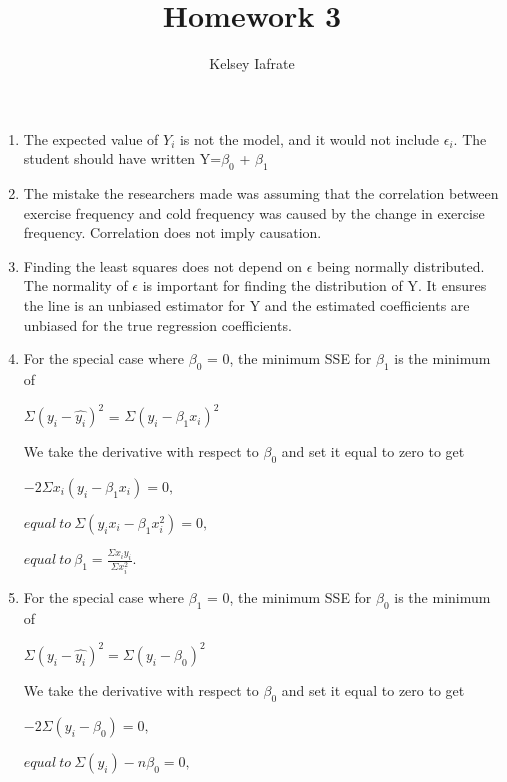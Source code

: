 \documentclass[]{article}
\author{Kelsey Iafrate}
\title{Homework 3}
\begin{document}
\maketitle




\begin{enumerate}

\item 
The expected value of $Y_i$ is not the model, and it would not include $\epsilon _i$. The student should have written Y=$\beta _0$ + $\beta _1$

\item
The mistake the researchers made was assuming that the correlation between exercise frequency and cold frequency was caused by the change in exercise frequency. Correlation does not imply causation.  

\item
Finding the least squares does not depend on $\epsilon$ being normally distributed. The normality of $\epsilon$ is important for finding the distribution of Y. It ensures the line is an unbiased estimator for Y and the estimated coefficients are unbiased for the true regression coefficients. 

\item
For the special case where $\beta _0$ = 0, the minimum SSE for $\beta _1$ is the minimum of
  
  \begin{center} $\Sigma (y_i-\hat{y_i})^2$ = $\Sigma (y_i - \beta _1x_i)^2$
  
  We take the derivative with respect to $\beta _0$ and set it equal to zero to get
  
  $-2\Sigma x_i(y_i-\beta  _1x_i) = 0 ,$
  
  $equal\ to\ \Sigma(y_ix_i-\beta _1x_i^2) = 0,$
  
  $equal\ to\ \beta _1 = \frac{\Sigma x_iy_i}{\Sigma x_i^2}.$
  \end{center}
  
\item 
For the special case where $\beta _1$ = 0, the minimum SSE for $\beta _0$ is the minimum of
  \begin{center} $\Sigma(y_i-\hat{y_i})^2 = \Sigma (y_i - \beta _0)^2$
  
  We take the derivative with respect to $\beta _0$ and set it equal to zero to get
  
  $-2\Sigma(y_i-\beta _0) = 0 ,$
  
  $equal\ to\ \Sigma (y_i) - n\beta _0 =0,$
  

\end{center}
\end{enumerate}
\end{document}
